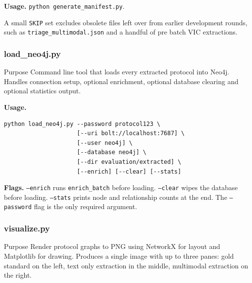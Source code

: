 \documentclass{article}
\begin{document}
\textbf{Usage.} \texttt{python generate\_manifest.py}.

A small \texttt{SKIP} set excludes obsolete files left over from
earlier development rounds, such as
\texttt{triage\_multimodal.json} and a handful of pre batch VIC
extractions.

\subsubsection{load\_neo4j.py}

\begin{codeconceptbox}{Purpose}
Command line tool that loads every extracted protocol into Neo4j.
Handles connection setup, optional enrichment, optional database
clearing and optional statistics output.
\end{codeconceptbox}

\textbf{Usage.}

\begin{tcolorbox}[colback=mygray, colframe=mygray, sharp corners, boxrule=0pt]
\begin{verbatim}
python load_neo4j.py --password protocol123 \
                     [--uri bolt://localhost:7687] \
                     [--user neo4j] \
                     [--database neo4j] \
                     [--dir evaluation/extracted] \
                     [--enrich] [--clear] [--stats]
\end{verbatim}
\end{tcolorbox}

\textbf{Flags.} \texttt{--enrich} runs \texttt{enrich\_batch} before
loading. \texttt{--clear} wipes the database before loading.
\texttt{--stats} prints node and relationship counts at the end. The
\texttt{--password} flag is the only required argument.

\subsubsection{visualize.py}

\begin{codeconceptbox}{Purpose}
Render protocol graphs to PNG using NetworkX for layout and
Matplotlib for drawing. Produces a single image with up to three
panes: gold standard on the left, text only extraction in the middle,
multimodal extraction on the right.
\end{codeconceptbox}
\end{document}
